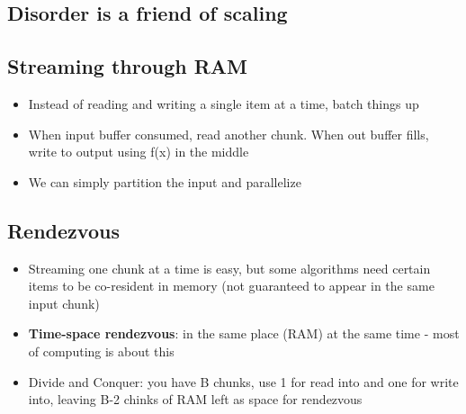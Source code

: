 \documentclass{article}
\begin{document}
\subsection{Disorder is a friend of scaling}

\subsection{Streaming through RAM}
\begin{itemize}
\item Instead of reading and writing a single item at a time, batch things up
\item When input buffer consumed, read another chunk. When out buffer fills, write to output using f(x) in the middle
\item We can simply partition the input and parallelize
\end{itemize}

\subsection{Rendezvous}
\begin{itemize}
\item Streaming one chunk at a time is easy, but some algorithms need certain items to be co-resident in memory (not guaranteed to appear in the same input chunk)
\item \textbf{Time-space rendezvous}: in the same place (RAM) at the same time - most of computing is about this
\item Divide and Conquer: you have B chunks, use 1 for read into and one for write into, leaving B-2 chinks of RAM left as space for rendezvous
\end{itemize}
\end{document}
